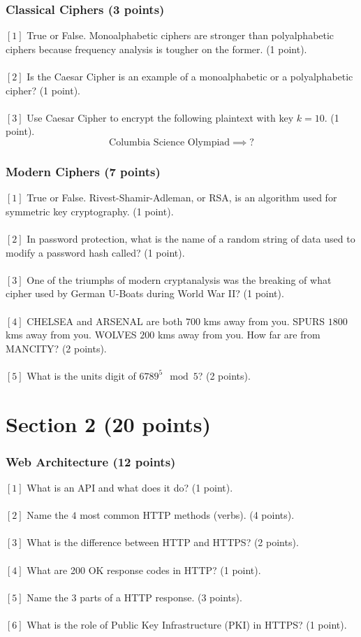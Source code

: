 \documentclass[letterpaper,12pt,addpoints]{exam}
\begin{document}
\subsubsection*{Classical Ciphers (3 points)}
$[1]$ True or False. Monoalphabetic ciphers are stronger than polyalphabetic ciphers because frequency analysis is tougher on the former. (1 point).\\
\\
$[2]$ Is the Caesar Cipher is an example of a monoalphabetic or a polyalphabetic cipher? (1 point).\\
\\
$[3]$ Use Caesar Cipher to encrypt the following plaintext with key $k=10$. (1 point).
$$
\text{Columbia Science Olympiad} \implies ?
$$
\subsubsection*{Modern Ciphers (7 points)}
$[1]$ True or False. Rivest-Shamir-Adleman, or RSA, is an algorithm used for symmetric key cryptography. (1 point).\\
\\
$[2]$ In password protection, what is the name of a random string of data used to modify a password hash called? (1 point).\\
\\
$[3]$ One of the triumphs of modern cryptanalysis was the breaking of what cipher used by German U-Boats during World War II? (1 point).\\
\\
$[4]$ CHELSEA and ARSENAL are both $700$ kms away from you. SPURS $1800$ kms away from you. WOLVES $200$ kms away from you. How far are from MANCITY? (2 points).\\
\\
$[5]$ What is the units digit of $6789^5 \mod 5$? (2 points).

\pagebreak
\section*{Section 2 (20 points)}
\subsubsection*{Web Architecture (12 points)}
$[1]$ What is an API and what does it do? (1 point).\\
\\
$[2]$ Name the $4$ most common HTTP methods (verbs). (4 points).\\
\\
$[3]$ What is the difference between HTTP and HTTPS? (2 points).\\
\\
$[4]$ What are 200 OK response codes in HTTP? (1 point).\\
\\
$[5]$ Name the 3 parts of a HTTP response. (3 points).\\
\\
$[6]$ What is the role of Public Key Infrastructure (PKI) in HTTPS? (1 point).
\end{document}
